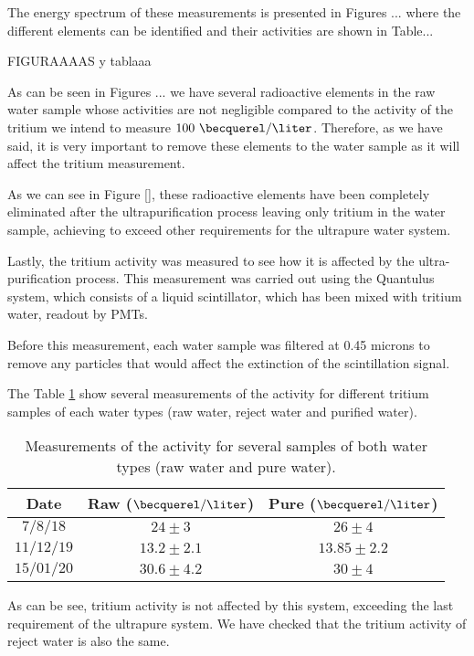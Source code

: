 The energy spectrum of these measurements is presented in Figures ... where the different elements can be identified and their activities are shown in Table...

FIGURAAAAS y tablaaa

As can be seen in Figures ... we have several radioactive elements in the raw water sample whose activities are not negligible compared to the activity of the tritium we intend to measure $100~\becquerel/\liter$. Therefore, as we have said, it is very important to remove these elements to the water sample as it will affect the tritium measurement.

As we can see in Figure \ref{}, these radioactive elements have been completely eliminated after the ultrapurification process leaving only tritium in the water sample, achieving to exceed other requirements for the ultrapure water system.

Lastly, the tritium activity was measured to see how it is affected by the ultra-purification process. This measurement was carried out using the Quantulus system, which consists of a liquid scintillator, which has been mixed with tritium water, readout by PMTs. 

Before this measurement, each water sample was filtered at 0.45 microns to remove any particles that would affect the extinction of the scintillation signal.

The Table \ref{tab:ActivityTritiumValues} show several measurements of the activity for different tritium samples of each water types (raw water, reject water and purified water).

\begin{table}[htbp]
\begin{center}
\begin{tabular}{|c|c|c|}
\hline
Date & Raw ($\becquerel/\liter$) & Pure ($\becquerel/\liter$) \\
\hline \hline \hline
$7/8/18$ & $24 \pm 3$ & $26 \pm 4$ \\ \hline
$11/12/19$ & $13.2 \pm 2.1$ & $13.85 \pm 2.2$ \\ \hline
$15/01/20$ & $30.6 \pm 4.2$ & $30 \pm 4$ \\ \hline
\end{tabular}
\caption{Measurements of the activity for several samples of both water types (raw water and pure water).}
\label{tab:ActivityTritiumValues}
\end{center}
\end{table}	

As can be see, tritium activity is not affected by this system, exceeding the last requirement of the ultrapure system. We have checked that the tritium activity of reject water is also the same.